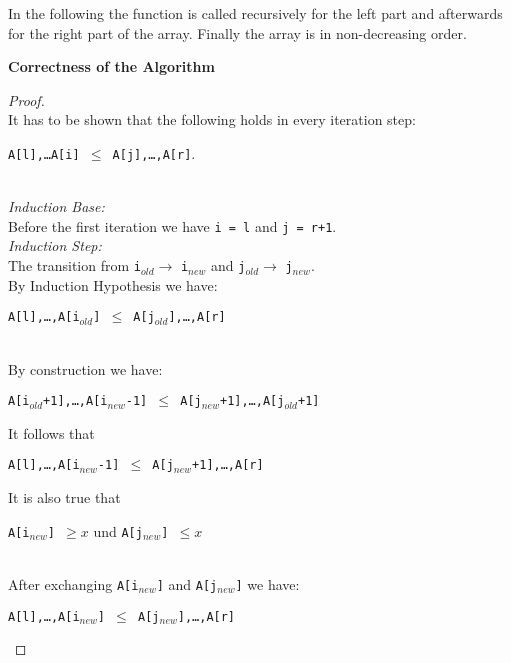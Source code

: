 \documentclass[12pt,a4paper]{article}
\begin{document}
In the following the function is called recursively for the left part and afterwards for the right part of the 
array. Finally the array is in non-decreasing order.\\

\newpage 

{\bf Correctness of the Algorithm}
\begin{proof}
\mbox{}\\
It has to be shown that the following holds in every iteration step:\\[-2ex]
\begin{center}
{\tt A[l],\ldots A[i] $\leq$ A[j],\ldots,A[r]}.
\end{center}
\mbox{}\\
{\em Induction Base:} \\[-2ex]

Before the first iteration we have {\tt i = l} and {\tt j = r+1}.\\

{\em Induction Step:} \\[-2ex]

The transition from {\tt i}$_{old} \to $ {\tt i}$_{new}$ and {\tt j}$_{old} \to $ {\tt j}$_{new}$.\\

By Induction Hypothesis we have:\\[-2ex]
\begin{center}
{\tt A[l],\ldots,A[i$_{old}$] $\leq$ A[j$_{old}$],\ldots,A[r]}
\end{center}
\mbox{}\\
By construction we have:
\begin{center}
{\tt A[i$_{old}$+1],\ldots,A[i$_{new}$-1] $\leq$ A[j$_{new}$+1],\ldots,A[j$_{old}$+1]}
\end{center}
It follows that 
\begin{center}
{\tt A[l],\ldots,A[i$_{new}$-1] $\leq$ A[j$_{new}$+1],\ldots,A[r]}
\end{center}
It is also true that
\begin{center}
{\tt A[i$_{new}$] $\geq x $} und {\tt A[j$_{new}$] $\leq x $}
\end{center}
\mbox{}\\
After exchanging {\tt A[i$_{new}$]} and {\tt A[j$_{new}$]} we have:\\[-2ex]
\begin{center}
{\tt A[l],\ldots,A[i$_{new}$] $\leq$ A[j$_{new}$],\ldots,A[r]}
\end{center}
\end{proof}
\mbox{}\\
\end{document}

